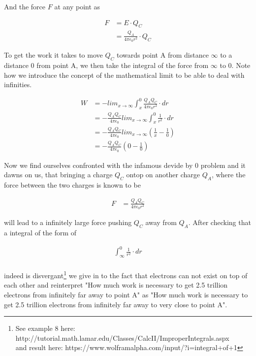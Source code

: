 \documentclass[paper=a4, fontsize=11pt]{scrartcl} %
\numberwithin{equation}{section} %
\numberwithin{figure}{section} %
\numberwithin{table}{section} %
\begin{document}
And the force $F$ at any point as

\begin{align} \label{eq:3}
F &= E \cdot Q_C \\
  &= \frac{Q_A}{4 \pi \epsilon_0 r^2} \cdot Q_C
\end{align}

To get the work it takes to move $Q_C$ towards point A from distance $\infty$ to a distance 0 from point A,
we then take the integral of the force from $\infty$ to 0. Note how we introduce the concept of the mathematical limit
to be able to deal with infinities.

\begin{align} \label{eq:4}
W &= - lim_{x\to\infty} \int_x^0{\frac{Q_A Q_C}{4 \pi \epsilon_0 r^2}} \cdot dr \\
  &= - \frac{Q_A Q_C}{4 \pi \epsilon_0 } lim_{x\to\infty} \int_x^0{\frac{1}{r^2}} \cdot dr \\
  &= - \frac{Q_A Q_C}{4 \pi \epsilon_0 } lim_{x\to\infty} \left( \frac{1}{x} - \frac{1}{0} \right) \\
  &= - \frac{Q_A Q_C}{4 \pi \epsilon_0 } \left( 0 - \frac{1}{0} \right)
\end{align}

Now we find ourselves confronted with the infamous devide by 0 problem and it dawns on us, that bringing a charge
$Q_C$ ontop on another charge $Q_A$, where the force between the two charges is known to be

\begin{align} \label{eq:3}
F &= \frac{Q_A  Q_C}{4 \pi \epsilon_0 r^2}
\end{align}

will lead to a infinitely large force pushing $Q_C$ away from $Q_A$. After checking that a integral of the form of

\begin{align} \label{eq:3}
\int_\infty^0{\frac{1}{r^2}} \cdot dr \\
\end{align}

indeed is disvergant\footnote{ See example 8 here: http://tutorial.math.lamar.edu/Classes/CalcII/ImproperIntegrals.aspx \\ and result here: https://www.wolframalpha.com/input/?i=integral+of+1%
} we give in to the fact that electrons can not exist on top of each other and reinterpret "How much work is necessary to get
2.5 trillion electrons from infinitely far away to point A" as "How much work is necessary to get
2.5 trillion electrons from infinitely far away to very close to point A".
\end{document}

